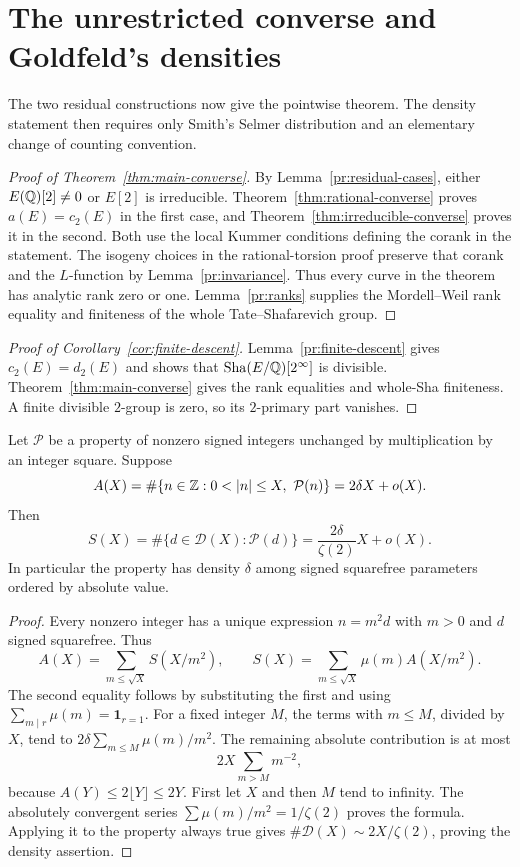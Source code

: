 \section{The unrestricted converse and Goldfeld's densities}
\label{sec:conclusions}

The two residual constructions now give the pointwise theorem. The
density statement then requires only Smith's Selmer distribution and
an elementary change of counting convention.

\begin{proof}[Proof of Theorem~\ref{thm:main-converse}]
By Lemma~\ref{pr:residual-cases}, either $E(\mathbb Q)[2]\ne0$ or $E[2]$
is irreducible. Theorem~\ref{thm:rational-converse} proves
$a(E)=c_2(E)$ in the first case, and
Theorem~\ref{thm:irreducible-converse} proves it in the second.
Both use the local Kummer conditions defining the corank in the
statement. The isogeny choices in the rational-torsion proof preserve
that corank and the $L$-function by Lemma~\ref{pr:invariance}.
Thus every curve in the theorem has analytic rank zero or one.
Lemma~\ref{pr:ranks} supplies the Mordell--Weil rank equality and
finiteness of the whole Tate--Shafarevich group.
\end{proof}

\begin{proof}[Proof of Corollary~\ref{cor:finite-descent}]
Lemma~\ref{pr:finite-descent} gives $c_2(E)=d_2(E)$ and shows that
$\operatorname{Sha}(E/\mathbb Q)[2^\infty]$ is divisible. Theorem~\ref{thm:main-converse}
gives the rank equalities and whole-Sha finiteness. A finite divisible
$2$-group is zero, so its $2$-primary part vanishes.
\end{proof}

\begin{lemma}\label{lem:squarefree-density}
Let $\mathcal P$ be a property of nonzero signed integers unchanged by
multiplication by an integer square. Suppose
\[
 A(X)=\#\{n\in\Z:0<|n|\le X,\ \mathcal P(n)\}
      =2\delta X+o(X).
\]
Then
\[
 S(X)=\#\{d\in\mathcal D(X):\mathcal P(d)\}
      =\frac{2\delta}{\zeta(2)}X+o(X).
\]
In particular the property has density $\delta$ among signed
squarefree parameters ordered by absolute value.
\end{lemma}

\begin{proof}
Every nonzero integer has a unique expression $n=m^2d$ with $m>0$
and $d$ signed squarefree. Thus
\[
 A(X)=\sum_{m\le\sqrt X}S(X/m^2),\qquad
 S(X)=\sum_{m\le\sqrt X}\mu(m)A(X/m^2).
\]
The second equality follows by substituting the first and using
$\sum_{m\mid r}\mu(m)=\mathbf1_{r=1}$.
For a fixed integer $M$, the terms with $m\le M$, divided by $X$,
tend to $2\delta\sum_{m\le M}\mu(m)/m^2$. The remaining absolute
contribution is at most
\[
 2X\sum_{m>M}m^{-2},
\]
because $A(Y)\le2\lfloor Y\rfloor\le2Y$.
First let $X$ and then $M$ tend to infinity. The absolutely convergent
series $\sum\mu(m)/m^2=1/\zeta(2)$ proves the formula.
Applying it to the property always true gives
$\#\mathcal D(X)\sim2X/\zeta(2)$, proving the density assertion.
\end{proof}

